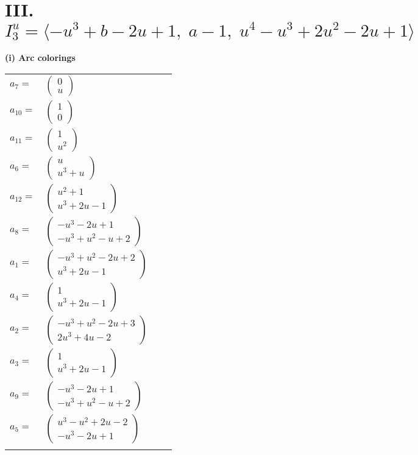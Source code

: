 \documentclass[1p]{elsarticle_modified}
\theoremstyle{definition}
\begin{document}
\centering \section*{III. $I^u_{3}= \langle - u^3+b-2 u+1,\;a-1,\;u^4- u^3+2 u^2-2 u+1 \rangle$}
\flushleft \textbf{(i) Arc colorings}\\
\begin{tabular}{m{7pt} m{180pt} m{7pt} m{180pt} }
\flushright $a_{7}=$&$\begin{pmatrix}0\\u\end{pmatrix}$ \\
\flushright $a_{10}=$&$\begin{pmatrix}1\\0\end{pmatrix}$ \\
\flushright $a_{11}=$&$\begin{pmatrix}1\\u^2\end{pmatrix}$ \\
\flushright $a_{6}=$&$\begin{pmatrix}u\\u^3+u\end{pmatrix}$ \\
\flushright $a_{12}=$&$\begin{pmatrix}u^2+1\\u^3+2 u-1\end{pmatrix}$ \\
\flushright $a_{8}=$&$\begin{pmatrix}- u^3-2 u+1\\- u^3+u^2- u+2\end{pmatrix}$ \\
\flushright $a_{1}=$&$\begin{pmatrix}- u^3+u^2-2 u+2\\u^3+2 u-1\end{pmatrix}$ \\
\flushright $a_{4}=$&$\begin{pmatrix}1\\u^3+2 u-1\end{pmatrix}$ \\
\flushright $a_{2}=$&$\begin{pmatrix}- u^3+u^2-2 u+3\\2 u^3+4 u-2\end{pmatrix}$ \\
\flushright $a_{3}=$&$\begin{pmatrix}1\\u^3+2 u-1\end{pmatrix}$ \\
\flushright $a_{9}=$&$\begin{pmatrix}- u^3-2 u+1\\- u^3+u^2- u+2\end{pmatrix}$ \\
\flushright $a_{5}=$&$\begin{pmatrix}u^3- u^2+2 u-2\\- u^3-2 u+1\end{pmatrix}$\\&\end{tabular}
\end{document}
